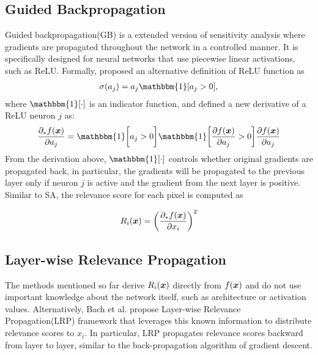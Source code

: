 \subsection{Guided Backpropagation}
Guided backpropagation(GB) is a extended version of sensitivity analysis where gradients are propagated throughout the network in a controlled manner. It is specifically designed for neural networks that use piecewise linear activations, such as ReLU. Formally, \cite{SpringenbergStrivingSimplicityAll2014e} proposed an alternative definition  of ReLU function as
\begin{align}
	\sigma(a_j) = a_j \mathbbm{1}[ a_j > 0 ],
\end{align}
where $\mathbbm{1}[ \cdot ]$  is an indicator function, and defined a new derivative of a ReLU neuron $j$ as:
\begin{align}
	\frac{\partial_* f(\patvector{x}) }{ \partial a_j } = \mathbbm{1}\bigg[a_j > 0 \bigg] \mathbbm{1}\bigg[ \frac{ \partial f(\patvector{x}) }{ \partial a_j } > 0 \bigg] \frac{ \partial f(\patvector{x}) }{ \partial a_j } 
\end{align}
From the derivation above, $\mathbbm{1}[ \cdot ]$ controls whether original gradients are propagated back, in particular, the gradients will be propagated to the previous layer only if neuron $j$ is active and the gradient from the next layer is positive. Similar to SA, the relevance score for each pixel is computed as 

\begin{align}
	R_i(\x) = \bigg( \frac{ \partial_* f(\patvector{x}) }{ \partial x_i }  \bigg)^2
\end{align}
%

\subsection{Layer-wise Relevance Propagation}
The methods mentioned so far derive $R_i(\boldsymbol{x})$ directly from $f(\patvector{x})$ and do not  use important knowledge about the network itself, such as architecture or activation values. Alternatively, Bach et	 al.\cite{BinderLayerWiseRelevancePropagation2016} propose Layer-wise Relevance Propagation(LRP) framework that leverages this known information to distribute relevance scores to $x_i$. In particular, LRP propagates relevance scores backward from layer to layer, similar to the back-propagation algorithm of gradient descent.




